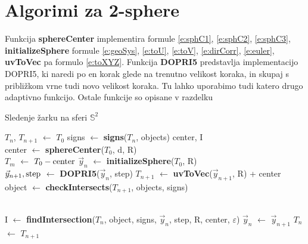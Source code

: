 \documentclass[titlepage]{article}
\begin{document}
\section{Algorimi za 2-sphere}
Funkcija \textbf{sphereCenter} implementira formule \eqref{e:sphC1}, \eqref{e:sphC2}, \eqref{e:sphC3}, \textbf{initializeSphere} formule \eqref{e:geoSys}, \eqref{e:toU}, \eqref{e:toV}, \eqref{e:dirCorr}, \eqref{e:euler}, \textbf{uvToVec} pa formulo \eqref{e:toXYZ}. Funkcija \textbf{DOPRI5} predstavlja implementacijo DOPRI5, ki naredi po en korak glede na trenutno velikost koraka, in skupaj s približkom vrne tudi novo velikost koraka. Tu lahko uporabimo tudi katero drugo adaptivno funkcijo. Ostale funkcije so opisane v
razdelku %
\begin{algorithm}
    \caption{Sledenje žarku na sferi $\mathbb{S}^{2}$}
\begin{algorithmic}

    \State $T_{n}$, $T_{n+1}$ $\gets$ $T_{0}$
    \State signs $\gets$ \textbf{signs}($T_{n}$, objects)
    \State center, I
    \\
    \State {}
      \State center $\gets$ \textbf{sphereCenter}($T_{0}$, d, R)
      \\
      \State $T_{m}$ $\gets$ $T_{0} - \hbox{center}$
      \State $\vec{y}_{n}$ $\gets$ \textbf{initializeSphere}($T_{0}$, R)
    \EndIf
    \\
    \State $\vec{y}_{n+1}, \hbox{step}$ $\gets$ \textbf{DOPRI5}($\vec{y}_{n}$, step)
    \State $T_{n+1}$ $\gets$ \textbf{uvToVec}($\vec{y}_{n+1}$, R) + center
    \\
    \State object $\gets$ \textbf{checkIntersects}($T_{n+1}$, objects, signs)
    \\
    \\

      \State I $\gets$ \textbf{findIntersection}($T_{n}$, object, signs, $\vec{y}_{n}$, step, R, center, $\varepsilon$)
      \State {}
    \Else
      \State $\vec{y}_{n}$ $\gets$ $\vec{y}_{n+1}$
      \State $T_{n}$ $\gets$ $T_{n+1}$
    \EndIf
  \EndWhile
\EndFunction
\end{algorithmic}
\end{algorithm}
\end{document}
